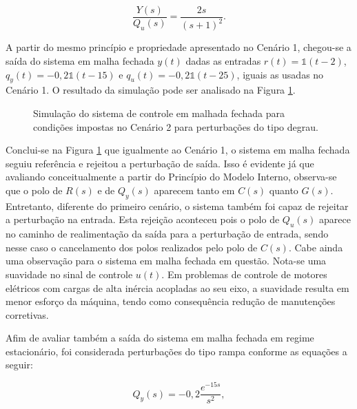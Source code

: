\begin{equation}
    \label{eq:y2qu-cenario2}
    \frac{Y(s)}{Q_{u}(s)} = \frac{2s}{(s + 1)^2}.
\end{equation}

A partir do mesmo princípio e propriedade apresentado no Cenário 1, chegou-se a
saída do sistema em malha fechada $y(t)$ dadas as entradas
$r(t) = \mathds{1}(t - 2)$, $q_{y}(t) = -0,2\mathds{1}(t - 15)$ e
$q_{u}(t) = -0,2\mathds{1}(t - 25)$, iguais as usadas no Cenário 1. O resultado
da simulação pode ser analisado na Figura \ref{fig:resultado-desafio1-cenario2-a}.

\begin{figure}[!ht]
    \caption{Simulação do sistema de controle em malhada fechada para condições
    impostas no Cenário 2 para perturbações do tipo degrau.}
    \vspace{-10pt}
    \hspace{-30pt}
    \label{fig:resultado-desafio1-cenario2-a}
    \begin{minipage}{\linewidth}
        
    \end{minipage}
\end{figure}

Conclui-se na Figura \ref{fig:resultado-desafio1-cenario2-a} que igualmente ao
Cenário 1, o sistema em malha fechada seguiu referência e rejeitou a perturbação
de saída. Isso é evidente já que avaliando conceitualmente a partir do Princípio
do Modelo Interno, observa-se que o polo de $R(s)$ e de $Q_{y}(s)$ aparecem
tanto em $C(s)$ quanto $G(s)$. Entretanto, diferente do primeiro cenário, o
sistema também foi capaz de rejeitar a perturbação na entrada. Esta rejeição
aconteceu pois o polo de $Q_{u}(s)$ aparece no caminho de realimentação da saída
para a perturbação de entrada, sendo nesse caso o cancelamento dos polos
realizados pelo polo de $C(s)$. Cabe ainda uma observação para o sistema em
malha fechada em questão. Nota-se uma suavidade no sinal de controle $u(t)$. Em
problemas de controle de motores elétricos com cargas de alta inércia acopladas
ao seu eixo, a suavidade resulta em menor esforço da máquina, tendo como
consequência redução de manutenções corretivas.

Afim de avaliar também a saída do sistema em malha fechada em regime
estacionário, foi considerada perturbações do tipo rampa conforme as equações
a seguir:

\begin{equation}
    \label{eq:qys-rampa-cenario2}
    Q_{y}(s) = -0,2\frac{e^{-15s}}{s^2},
\end{equation}

